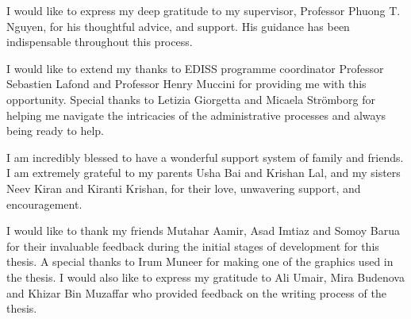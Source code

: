 \documentclass[
11pt, %
english, %
singlespacing, %
headsepline, %
]{MastersDoctoralThesis} %
\begin{document}
\begin{acknowledgements}
\addchaptertocentry{\acknowledgementname} %
I would like to express my deep gratitude to my supervisor, Professor Phuong T. Nguyen, for his thoughtful advice, and support. His guidance has been indispensable throughout this process.

I would like to extend my thanks to EDISS programme coordinator Professor Sebastien Lafond and Professor Henry Muccini for providing me with this opportunity. Special thanks to Letizia Giorgetta and Micaela Strömborg for helping me navigate the intricacies of the administrative processes and always being ready to help.

I am incredibly blessed to have a wonderful support system of family and friends. I am extremely grateful to my parents Usha Bai and Krishan Lal, and my sisters Neev Kiran and Kiranti Krishan, for their love, unwavering support, and encouragement.

I would like to thank my friends Mutahar Aamir, Asad Imtiaz and Somoy Barua for their invaluable feedback during the initial stages of development for this thesis. A special thanks to Irum Muneer for making one of the graphics used in the thesis. I would also like to express my gratitude to Ali Umair, Mira Budenova and Khizar Bin Muzaffar who provided feedback on the writing process of the thesis. 

\end{acknowledgements}


\tableofcontents %

\listoffigures %

\listoftables %

\end{document}
